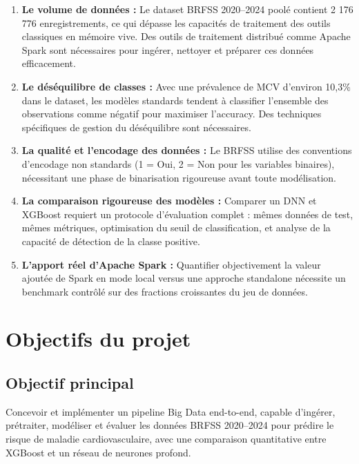 \begin{enumerate}
    \item \textbf{Le volume de données :} Le dataset BRFSS 2020--2024 poolé contient 2 176 776 enregistrements, ce qui dépasse les capacités de traitement des outils classiques en mémoire vive. Des outils de traitement distribué comme Apache Spark sont nécessaires pour ingérer, nettoyer et préparer ces données efficacement.

    \item \textbf{Le déséquilibre de classes :} Avec une prévalence de MCV d'environ 10,3\% dans le dataset, les modèles standards tendent à classifier l'ensemble des observations comme négatif pour maximiser l'accuracy. Des techniques spécifiques de gestion du déséquilibre sont nécessaires.

    \item \textbf{La qualité et l'encodage des données :} Le BRFSS utilise des conventions d'encodage non standards (1 = Oui, 2 = Non pour les variables binaires), nécessitant une phase de binarisation rigoureuse avant toute modélisation.

    \item \textbf{La comparaison rigoureuse des modèles :} Comparer un DNN et XGBoost requiert un protocole d'évaluation complet : mêmes données de test, mêmes métriques, optimisation du seuil de classification, et analyse de la capacité de détection de la classe positive.

    \item \textbf{L'apport réel d'Apache Spark :} Quantifier objectivement la valeur ajoutée de Spark en mode local versus une approche standalone nécessite un benchmark contrôlé sur des fractions croissantes du jeu de données.
\end{enumerate}

\section{Objectifs du projet}

\subsection{Objectif principal}

Concevoir et implémenter un pipeline Big Data end-to-end, capable d'ingérer, prétraiter, modéliser et évaluer les données BRFSS 2020--2024 pour prédire le risque de maladie cardiovasculaire, avec une comparaison quantitative entre XGBoost et un réseau de neurones profond.

